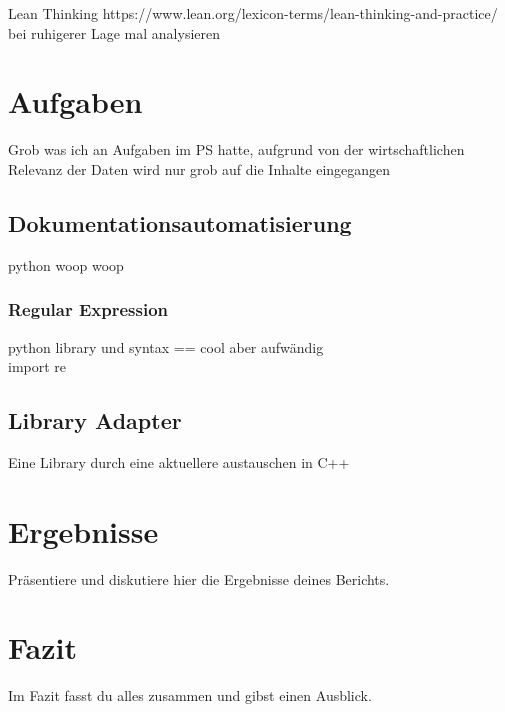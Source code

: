 \documentclass[a4paper, 12pt]{article}
\begin{document}
Lean Thinking https://www.lean.org/lexicon-terms/lean-thinking-and-practice/
bei ruhigerer Lage mal analysieren %
 

\cite{scrum2020}


\newpage
\section{Aufgaben}\label{Aufgaben}
Grob was ich an Aufgaben im PS hatte, aufgrund von der wirtschaftlichen Relevanz der Daten wird nur grob auf die Inhalte eingegangen

\subsection{Dokumentationsautomatisierung}\label{Dokumentationsautomatisierung}
python woop woop
\subsubsection{Regular Expression}\label{regularExpression}
python library und syntax == cool aber aufwändig \\
import re

\subsection{Library Adapter}\label{LibraryAdapter}
Eine Library durch eine aktuellere austauschen in C++

\newpage
\section{Ergebnisse}
Präsentiere und diskutiere hier die Ergebnisse deines Berichts.

\newpage
\section{Fazit}
Im Fazit fasst du alles zusammen und gibst einen Ausblick.

\newpage

\end{document}
